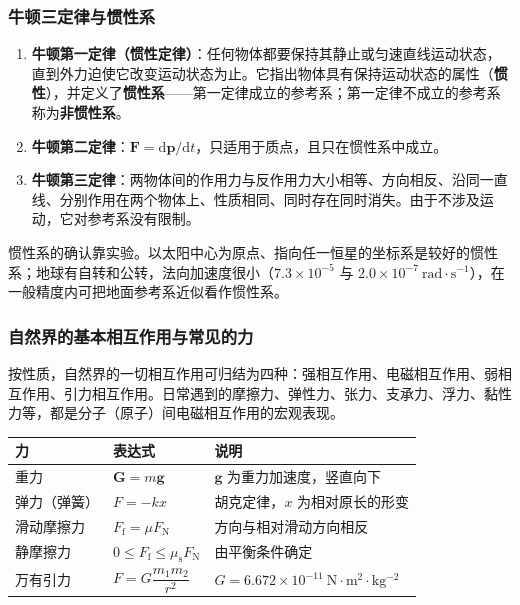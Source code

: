         \subsubsection{牛顿三定律与惯性系}
        \begin{enumerate}
            \item \textbf{牛顿第一定律（惯性定律）}：任何物体都要保持其静止或匀速直线运动状态，直到外力迫使它改变运动状态为止。它指出物体具有保持运动状态的属性（\textbf{惯性}），并定义了\textbf{惯性系}——第一定律成立的参考系；第一定律不成立的参考系称为\textbf{非惯性系}。
            \item \textbf{牛顿第二定律}：$\boldsymbol{F}=\mathrm{d}\boldsymbol{p}/\mathrm{d}t$，只适用于质点，且只在惯性系中成立。
            \item \textbf{牛顿第三定律}：两物体间的作用力与反作用力大小相等、方向相反、沿同一直线、分别作用在两个物体上、性质相同、同时存在同时消失。由于不涉及运动，它对参考系没有限制。
        \end{enumerate}
        惯性系的确认靠实验。以太阳中心为原点、指向任一恒星的坐标系是较好的惯性系；地球有自转和公转，法向加速度很小（$7.3\times10^{-5}$ 与 $2.0\times10^{-7}\ \mathrm{rad\cdot s^{-1}}$），在一般精度内可把地面参考系近似看作惯性系。

        \subsubsection{自然界的基本相互作用与常见的力}
        按性质，自然界的一切相互作用可归结为四种：强相互作用、电磁相互作用、弱相互作用、引力相互作用。日常遇到的摩擦力、弹性力、张力、支承力、浮力、黏性力等，都是分子（原子）间电磁相互作用的宏观表现。

        \begin{center}
        \begin{tabular}{lll}
        \toprule
        力 & 表达式 & 说明 \\
        \midrule
        重力 & $\boldsymbol{G}=m\boldsymbol{g}$ & $\boldsymbol{g}$ 为重力加速度，竖直向下 \\
        弹力（弹簧） & $F=-kx$ & 胡克定律，$x$ 为相对原长的形变 \\
        滑动摩擦力 & $F_{\mathrm{f}}=\mu F_{\mathrm{N}}$ & 方向与相对滑动方向相反 \\
        静摩擦力 & $0\leqslant F_{\mathrm{f}}\leqslant\mu_{\mathrm{s}}F_{\mathrm{N}}$ & 由平衡条件确定 \\
        万有引力 & $F=G\dfrac{m_{1}m_{2}}{r^{2}}$ & $G=6.672\times10^{-11}\ \mathrm{N\cdot m^{2}\cdot kg^{-2}}$ \\
        \bottomrule
        \end{tabular}
        \end{center}

